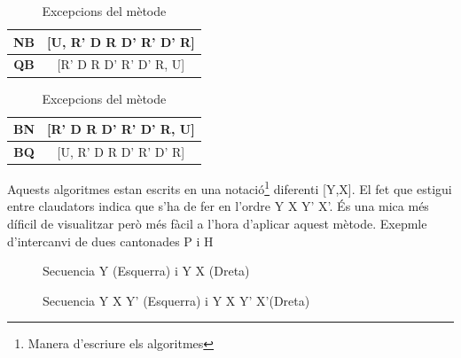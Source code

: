 \begin{table}[h]
    \begin{minipage}{.5\linewidth}
        \centering
        \begin{tabular}{|c|c|}
            \hline
            \textbf{NB} & [U, R' D R D' R' D' R] \\
            \hline
            \textbf{QB} & [R' D R D' R' D' R, U] \\
            \hline
        \end{tabular}
    \end{minipage}
    \begin{minipage}{.5\linewidth}
        \centering
        \begin{tabular}{|c|c|}
            \hline
            \textbf{BN} & [R' D R D' R' D' R, U] \\
            \hline
            \textbf{BQ} & [U, R' D R D' R' D' R] \\
            \hline 
        \end{tabular}
    \end{minipage} 
    \caption{Excepcions del mètode}
\end{table}



Aquests algoritmes estan escrits en una notació\footnote{Manera d'escriure els algoritmes} diferenti [Y,X]. El fet que estigui entre claudators indica que s'ha de fer en l'ordre Y X Y' X'. És una mica més díficil de visualitzar però més fàcil a l'hora d'aplicar aquest mètode.
Exepmle d'intercanvi de dues cantonades P i H

\begin{figure}[h!]
    \centering
    \begin{subfigure}
        \centering\RubikCubeSolvedWY
    \end{subfigure}
    \begin{subfigure}
        \centering\RubikCubeSolvedWY
    \end{subfigure}
    \caption{Secuencia Y (Esquerra) i Y X (Dreta)}
\end{figure}

\begin{figure}[h!]
    \centering
    \begin{subfigure}
        \centering\RubikCubeSolvedWY
    \end{subfigure}
    \begin{subfigure}
        \centering\RubikCubeSolvedWY
    \end{subfigure}
    \caption{Secuencia Y X Y' (Esquerra) i Y X Y' X'(Dreta)}
\end{figure}

